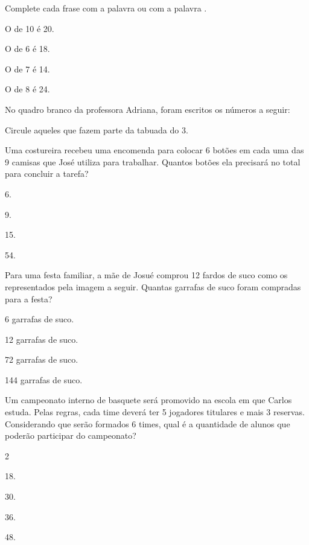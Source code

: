 \subsubsubsection[reference={section-11}]

Complete cada frase com a palavra  ou com a palavra
.

\startitemize
\item
  O de 10 é 20.
\item
  O de 6 é 18.
\item
  O de 7 é 14.
\item
  O de 8 é 24.
\stopitemize

\subsubsubsection[reference={section-12}]

No quadro branco da professora Adriana, foram escritos os números a
seguir:

{}

Circule aqueles que fazem parte da tabuada do 3.

\subsubject[title={Treino},reference={treino}]

\subsubsubsection[reference={section-13}]

Uma costureira recebeu uma encomenda para colocar 6 botões em cada uma
das 9 camisas que José utiliza para trabalhar. Quantos botões ela
precisará no total para concluir a tarefa?

{}

\startitemize
\item
  6.
\item
  9.
\item
  15.
\item
  54.
\stopitemize

\subsubsubsection[reference={section-14}]

Para uma festa familiar, a mãe de Josué comprou 12 fardos de suco como
os representados pela imagem a seguir. Quantas garrafas de suco foram
compradas para a festa?

{}

\startitemize
\item
  6 garrafas de suco.
\item
  12 garrafas de suco.
\item
  72 garrafas de suco.
\item
  144 garrafas de suco.
\stopitemize

\subsubsubsection[reference={section-15}]

Um campeonato interno de basquete será promovido na escola em que Carlos
estuda. Pelas regras, cada time deverá ter 5 jogadores titulares e mais
3 reservas. Considerando que serão formados 6 times, qual é a quantidade
de alunos que poderão participar do campeonato?

{}

2

\startitemize
\item
  18.
\item
  30.
\item
  36.
\item
  48.
\stopitemize
